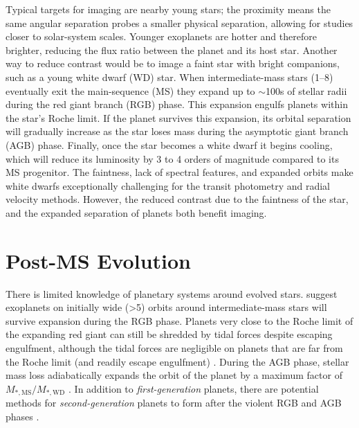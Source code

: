 \documentclass[twocolumn,linenumbers]{aastex631}
\begin{document}
Typical targets for imaging are nearby young stars; the proximity means the same angular separation probes a smaller physical separation, allowing for studies closer to solar-system scales. Younger exoplanets are hotter and therefore brighter, reducing the flux ratio between the planet and its host star. Another way to reduce contrast would be to image a faint star with bright companions, such as a young white dwarf (WD) star. When intermediate-mass stars (\qtyrange{1}{8}{\solarmass}) eventually exit the main-sequence (MS) they expand up to $\sim$100s of stellar radii during the red giant branch (RGB) phase. This expansion engulfs planets within the star's Roche limit. If the planet survives this expansion, its orbital separation will gradually increase as the star loses mass during the asymptotic giant branch (AGB) phase. Finally, once the star becomes a white dwarf it begins cooling, which will reduce its luminosity by 3 to 4 orders of magnitude compared to its MS progenitor. The faintness, lack of spectral features, and expanded orbits make white dwarfs exceptionally challenging for the transit photometry and radial velocity methods. However, the reduced contrast due to the faintness of the star, and the expanded separation of planets both benefit imaging.

\section{Post-MS Evolution}

There is limited knowledge of planetary systems around evolved stars. \citet{burleigh_imaging_2002,veras_post-main-sequence_2016} suggest exoplanets on initially wide (\textgreater\qty{5}{\au}) orbits around intermediate-mass stars will survive expansion during the RGB phase. Planets very close to the Roche limit of the expanding red giant can still be shredded by tidal forces despite escaping engulfment, although the tidal forces are negligible on planets that are far from the Roche limit (and readily escape engulfment) \citep{nordhaus_orbits_2013}. During the AGB phase, stellar mass loss adiabatically expands the orbit of the planet by a maximum factor of $M_{*,\mathrm{MS}}/M_{*,\mathrm{WD}}$ \citep{jeans_cosmogonic_1924}. In addition to \textit{first-generation} planets, there are potential methods for \textit{second-generation} planets to form after the violent RGB and AGB phases \citep{perets_second_2010}.
\end{document}
